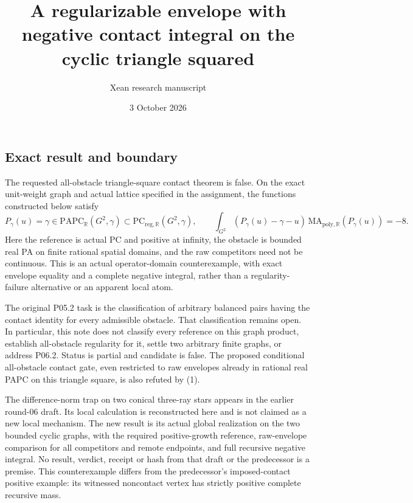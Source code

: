 \documentclass[
  10pt,
]{article}
\title{A regularizable envelope with negative contact integral on the
cyclic triangle squared}
\author{Xean research manuscript}
\date{3 October 2026}
\begin{document}
\maketitle

\subsection{Exact result and boundary}\label{exact-result-and-boundary}

The requested all-obstacle triangle-square contact theorem is false. On
the exact unit-weight graph and actual lattice specified in the
assignment, the functions constructed below satisfy \[
 P_\gamma(u)=\gamma\in\mathrm{PAPC}_{\mathbb{R}}(G^2,\gamma)
 \subset\mathrm{PC}_{\mathrm{reg},\mathbb{R}}(G^2,\gamma),\qquad
 \int_{G^2}(P_\gamma(u)-\gamma-u)\,
           \mathrm{MA}_{\mathrm{poly},\mathbb{R}}(P_\gamma(u))=-8.
 \tag{1}
\] Here the reference is actual PC and positive at infinity, the
obstacle is bounded real PA on finite rational spatial domains, and the
raw competitors need not be continuous. This is an actual
operator-domain counterexample, with exact envelope equality and a
complete negative integral, rather than a regularity-failure alternative
or an apparent local atom.

The original P05.2 task is the classification of arbitrary balanced
pairs having the contact identity for every admissible obstacle. That
classification remains open. In particular, this note does not classify
every reference on this graph product, establish all-obstacle regularity
for it, settle two arbitrary finite graphs, or address P06.2. Status is
partial and candidate is false. The proposed conditional all-obstacle
contact gate, even restricted to raw envelopes already in rational real
PAPC on this triangle square, is also refuted by (1).

The difference-norm trap on two conical three-ray stars appears in the
earlier round-06 draft. Its local calculation is reconstructed here and
is not claimed as a new local mechanism. The new result is its actual
global realization on the two bounded cyclic graphs, with the required
positive-growth reference, raw-envelope comparison for all competitors
and remote endpoints, and full recursive negative integral. No result,
verdict, receipt or hash from that draft or the predecessor is a
premise. This counterexample differs from the predecessor's
imposed-contact positive example: its witnessed noncontact vertex has
strictly positive complete recursive mass.
\end{document}
